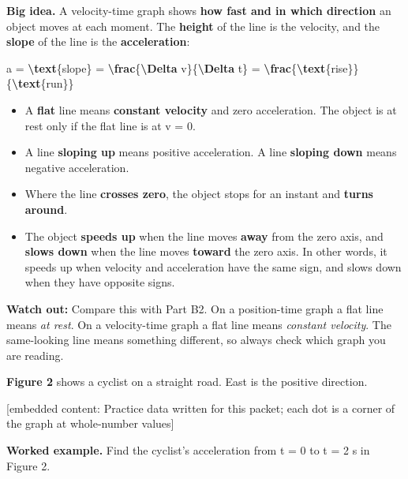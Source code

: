 \documentclass[
]{article}
\newenvironment{Shaded}{\begin{snugshade}}{\end{snugshade}}
\newcommand{\FunctionTok}[1]{\textcolor[rgb]{0.13,0.29,0.53}{\textbf{#1}}}
\newcommand{\NormalTok}[1]{#1}
\providecommand{\tightlist}{%
  \setlength{\itemsep}{0pt}\setlength{\parskip}{0pt}}
\begin{document}
\textbf{Big idea.} A velocity-time graph shows \textbf{how fast and in
which direction} an object moves at each moment. The \textbf{height} of
the line is the velocity, and the \textbf{slope} of the line is the
\textbf{acceleration}:

\begin{Shaded}
\begin{Highlighting}[]
\NormalTok{a = }\FunctionTok{\textbackslash{}text}\NormalTok{\{slope\} = }\FunctionTok{\textbackslash{}frac}\NormalTok{\{}\FunctionTok{\textbackslash{}Delta}\NormalTok{ v\}\{}\FunctionTok{\textbackslash{}Delta}\NormalTok{ t\} = }\FunctionTok{\textbackslash{}frac}\NormalTok{\{}\FunctionTok{\textbackslash{}text}\NormalTok{\{rise\}\}\{}\FunctionTok{\textbackslash{}text}\NormalTok{\{run\}\}}
\end{Highlighting}
\end{Shaded}

\begin{itemize}
\tightlist
\item
  A \textbf{flat} line means \textbf{constant velocity} and zero
  acceleration. The object is at rest only if the flat line is at v = 0.
\item
  A line \textbf{sloping up} means positive acceleration. A line
  \textbf{sloping down} means negative acceleration.
\item
  Where the line \textbf{crosses zero}, the object stops for an instant
  and \textbf{turns around}.
\item
  The object \textbf{speeds up} when the line moves \textbf{away} from
  the zero axis, and \textbf{slows down} when the line moves
  \textbf{toward} the zero axis. In other words, it speeds up when
  velocity and acceleration have the same sign, and slows down when they
  have opposite signs.
\end{itemize}

\textbf{Watch out:} Compare this with Part B2. On a position-time graph
a flat line means \emph{at rest}. On a velocity-time graph a flat line
means \emph{constant velocity}. The same-looking line means something
different, so always check which graph you are reading.

\textbf{Figure 2} shows a cyclist on a straight road. East is the
positive direction.

{[}embedded content: Practice data written for this packet; each dot is
a corner of the graph at whole-number values{]}

\textbf{Worked example.} Find the cyclist's acceleration from t = 0 to t
= 2 s in Figure 2.
\end{document}
